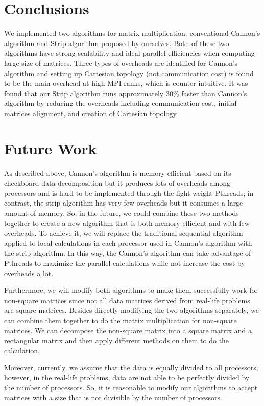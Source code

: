 \documentclass[conference]{IEEEtran}
\begin{document}
\section{Conclusions}\label{conclusions}
We implemented two algorithms for matrix multiplication: conventional Cannon's algorithm and Strip algorithm proposed by ourselves. Both of these two algorithms have strong scalability and ideal parallel efficiencies when computing large size of matrices. Three types of overheads are identified for Cannon's algorithm and setting up Cartesian topology (not communication cost) is found to be the main overhead at high MPI ranks, which is counter intuitive. It was found that our Strip algorithm runs approximately 30\% faster than Cannon's algorithm by reducing the overheads including communication cost, initial matrices alignment, and creation of Cartesian topology.

\section{Future Work}\label{future_work}
As described above, Cannon's algorithm is memory efficient based on its checkboard data decomposition but it produces lots of overheads among processors and is hard to be implemented through the light weight Pthreads; in contrast, the strip algorithm has very few overheads but it consumes a large amount of memory. So, in the future, we could combine these two methods together to create a new algorithm that is both memory-efficient and with few overheads. To achieve it, we will replace the traditional sequential algorithm applied to local calculations in each processor used in Cannon's algorithm with the strip algorithm. In this way, the Cannon's algorithm can take advantage of Pthreads to maximize the parallel calculations while not increase the cost by overheads a lot. 

Furthermore, we will modify both algorithms to make them successfully work for non-square matrices since not all data matrices derived from real-life problems are square matrices. Besides directly modifying the two algorithms separately, we can combine them together to do the matrix multiplication for non-square matrices. We can decompose the non-square matrix into a square matrix and a rectangular matrix and then apply different methods on them to do the calculation. 

Moreover, currently, we assume that the data is equally divided to all processors; however, in the real-life problems, data are not able to be perfectly divided by the number of processors. So, it is reasonable to modify our algorithms to accept matrices with a size that is not divisible by the number of processors.
\end{document}
